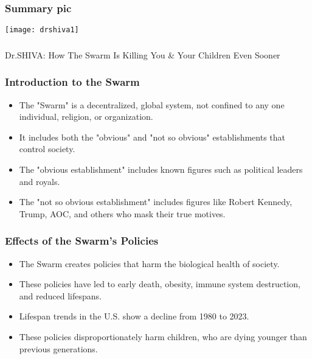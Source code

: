 \begin{frame}[fragile]\frametitle{Summary pic}

\begin{center}
\texttt{[image: drshiva1]}
\end{center}	  
\end{frame}

\begin{frame}[fragile]\frametitle{}
\begin{center}
{\Large Dr.SHIVA: How The Swarm Is Killing You \& Your Children Even Sooner}
\end{center}
\end{frame}

\begin{frame}[fragile]\frametitle{Introduction to the Swarm}
      \begin{itemize}
          \item The "Swarm" is a decentralized, global system, not confined to any one individual, religion, or organization.
          \item It includes both the "obvious" and "not so obvious" establishments that control society.
          \item The "obvious establishment" includes known figures such as political leaders and royals.
          \item The "not so obvious establishment" includes figures like Robert Kennedy, Trump, AOC, and others who mask their true motives.
      \end{itemize}
\end{frame}

\begin{frame}[fragile]\frametitle{Effects of the Swarm’s Policies}
      \begin{itemize}
          \item The Swarm creates policies that harm the biological health of society.
          \item These policies have led to early death, obesity, immune system destruction, and reduced lifespans.
          \item Lifespan trends in the U.S. show a decline from 1980 to 2023.
          \item These policies disproportionately harm children, who are dying younger than previous generations.
      \end{itemize}
\end{frame}

